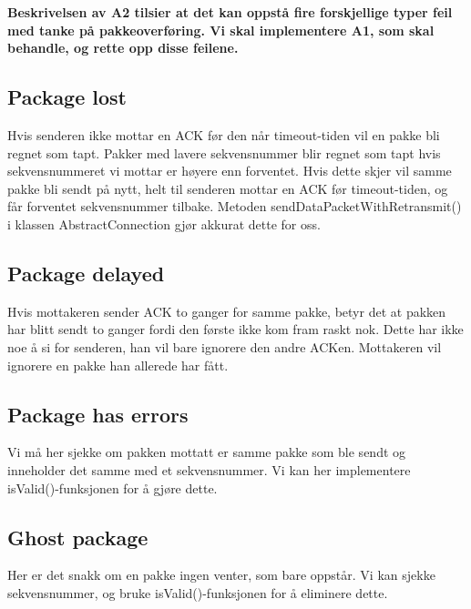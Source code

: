 \textbf{Beskrivelsen av A2 tilsier at det kan oppstå fire forskjellige typer feil med tanke på pakkeoverføring. Vi skal implementere A1, som skal behandle, og rette opp disse feilene.}

\subsection{Package lost}
Hvis senderen ikke mottar en ACK før den når timeout-tiden vil en pakke bli regnet som tapt.
Pakker med lavere sekvensnummer blir regnet som tapt hvis sekvensnummeret vi mottar er høyere enn forventet. 
Hvis dette skjer vil samme pakke bli sendt på nytt, helt til senderen mottar en ACK før timeout-tiden, og får forventet sekvensnummer tilbake.
Metoden sendDataPacketWithRetransmit() i klassen AbstractConnection gjør akkurat dette for oss. 

\subsection{Package delayed}
Hvis mottakeren sender ACK to ganger for samme pakke, betyr det at pakken har blitt sendt to ganger fordi den første ikke kom fram raskt nok.
Dette har ikke noe å si for senderen, han vil bare ignorere den andre ACKen. Mottakeren vil ignorere en pakke han allerede har fått. 
 
\subsection{Package has errors}
Vi må her sjekke om pakken mottatt er samme pakke som ble sendt og inneholder det samme med et sekvensnummer. Vi kan her implementere isValid()-funksjonen for å gjøre dette. 
 
\subsection{Ghost package}
Her er det snakk om en pakke ingen venter, som bare oppstår. Vi kan sjekke sekvensnummer, og bruke isValid()-funksjonen for å eliminere dette. 